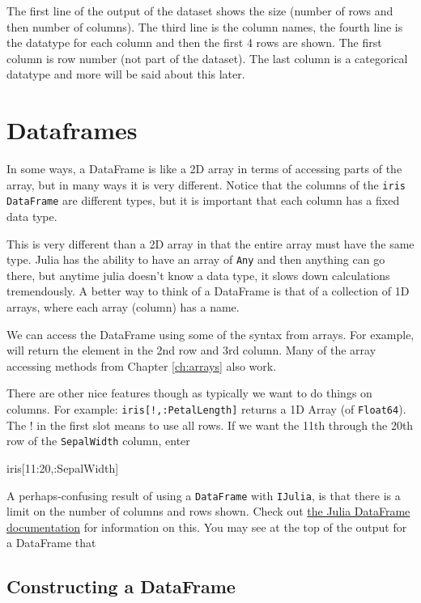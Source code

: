 The first line of the output of the dataset shows the size (number of rows and then number of columns).  The third line is the column names, the fourth line is the datatype for each column and then the first 4 rows are shown.  The first column is row number (not part of the dataset).   The last column is a categorical datatype and more will be said about this later.  

\section{Dataframes}
In some ways, a DataFrame is like a 2D array in terms of accessing parts of the array, but in many ways it is very different.  Notice that the columns of the \texttt{iris} \texttt{DataFrame} are different types, but it is important that each column has a fixed data type. 

This is very different than a 2D array in that the entire array must have the same type.  Julia has the ability to have an array of \texttt{Any} and then anything can go there, but anytime julia doesn't know a data type, it slows down calculations tremendously. A better way to think of a DataFrame is that of a collection of 1D arrays, where each array (column) has a name. 

We can access the DataFrame using some of the syntax from arrays.  For example,  will return the element in the 2nd row and 3rd column. Many of the array accessing methods from Chapter \ref{ch:arrays} also work. 

There are other nice features though as typically we want to do things on columns.   For example: \texttt{iris[!,:PetalLength]} returns a 1D Array (of \verb!Float64!).  The ! in the first slot means to use all rows.  If we want the 11th through the 20th row of the \texttt{SepalWidth} column, enter
\begin{jlblock}[data]
iris[11:20,:SepalWidth]
\end{jlblock}

A perhaps-confusing result of using a \texttt{DataFrame} with \texttt{IJulia}, is that there is a limit on the number of columns and rows shown.  Check out \href{http://juliadata.github.io/DataFrames.jl/latest/man/getting_started.html}{the Julia DataFrame documentation} for information on this.  You may see at the top of the output for a DataFrame that 



\subsection{Constructing a DataFrame}

